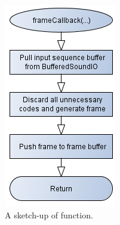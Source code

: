 	\begin{figure}[htb]
		\begin{center}
		\includegraphics[scale=0.7,trim=0 0 0 0]{content/graphics/physical/physical_frame_callback.png}%
		\caption{A sketch-up of  function.}
		\label{fig:physical_frame_callback}
		\end{center}
	\end{figure}
